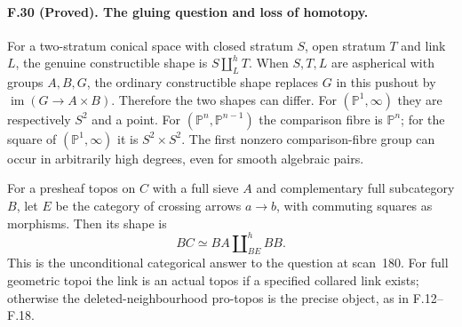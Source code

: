 \paragraph{F.30 (Proved). The gluing question
and loss of homotopy.}
For a two-stratum conical space with closed stratum $S$, open stratum
$T$ and link $L$, the genuine constructible shape is
$S\amalg_L^hT$. When $S,T,L$ are aspherical with groups $A,B,G$,
the ordinary constructible shape replaces $G$ in this pushout by
$\operatorname{im}(G\to A\times B)$. Therefore the two shapes can
differ. For $(\mathbb P^1,\infty)$ they are respectively $S^2$ and
a point. For $(\mathbb P^n,\mathbb P^{n-1})$ the comparison fibre
is $\mathbb P^n$; for the square of $(\mathbb P^1,\infty)$ it is
$S^2\times S^2$. The first nonzero comparison-fibre group can occur
in arbitrarily high degrees, even for smooth algebraic pairs.

For a presheaf topos on $C$ with a full sieve $A$ and complementary
full subcategory $B$, let $E$ be the category of crossing arrows
$a\to b$, with commuting squares as morphisms. Then its shape is
\[
 BC\simeq BA\amalg_{BE}^{h}BB.
\]
This is the unconditional categorical answer to the question at
scan~180. For full geometric topoi the link is an actual topos if a
specified collared link exists; otherwise the deleted-neighbourhood
pro-topos is the precise object, as in F.12--F.18.

